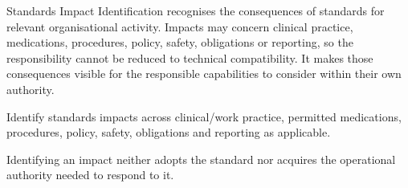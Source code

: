 Standards Impact Identification recognises the consequences of standards for relevant organisational activity. Impacts may concern clinical practice, medications, procedures, policy, safety, obligations or reporting, so the responsibility cannot be reduced to technical compatibility. It makes those consequences visible for the responsible capabilities to consider within their own authority.



Identify standards impacts across clinical/\allowbreak{}work practice, permitted medications, procedures, policy, safety, obligations and reporting as applicable.



Identifying an impact neither adopts the standard nor acquires the operational authority needed to respond to it.


